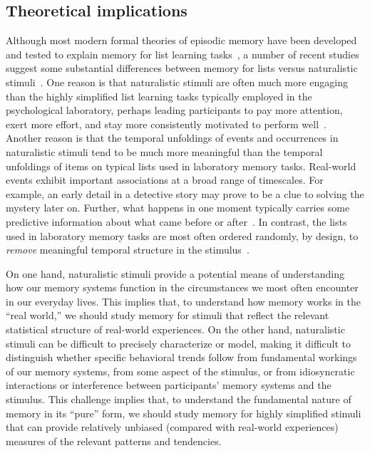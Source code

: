 \documentclass[11pt]{article}
\begin{document}

\subsection*{Theoretical implications}

Although most modern formal theories of episodic memory have been developed and
tested to explain memory for list learning tasks~\citep{Kaha20}, a number of
recent studies suggest some substantial differences between memory for lists
versus naturalistic stimuli~\citep[e.g., real-world experiences, narratives,
films, etc.;][]{NastEtal20, HeusEtal21, Mann21a, LeeEtal20}. One reason is that
naturalistic stimuli are often much more engaging than the highly simplified
list learning tasks typically employed in the psychological laboratory, perhaps
leading participants to pay more attention, exert more effort, and stay more
consistently motivated to perform well~\citep{NastEtal20}. Another reason is
that the temporal unfoldings of events and occurrences in naturalistic stimuli
tend to be much more meaningful than the temporal unfoldings of items on
typical lists used in laboratory memory tasks. Real-world events exhibit
important associations at a broad range of timescales. For example, an early
detail in a detective story may prove to be a clue to solving the mystery later
on. Further, what happens in one moment typically carries some predictive
information about what came before or after~\citep{XuEtal23}. In contrast, the
lists used in laboratory memory tasks are most often ordered randomly, by
design, to \textit{remove} meaningful temporal structure in the
stimulus~\citep{Kaha12}.

On one hand, naturalistic stimuli provide a potential means of understanding
how our memory systems function in the circumstances we most often encounter in
our everyday lives. This implies that, to understand how memory works in the
``real world,'' we should study memory for stimuli that reflect the relevant
statistical structure of real-world experiences. On the other hand,
naturalistic stimuli can be difficult to precisely characterize or model,
making it difficult to distinguish whether specific behavioral trends follow
from fundamental workings of our memory systems, from some aspect of the
stimulus, or from idiosyncratic interactions or interference between
participants' memory systems and the stimulus. This challenge implies that, to
understand the fundamental nature of memory in its ``pure'' form, we should
study memory for highly simplified stimuli that can provide relatively unbiased
(compared with real-world experiences) measures of the relevant patterns and
tendencies.
\end{document}
